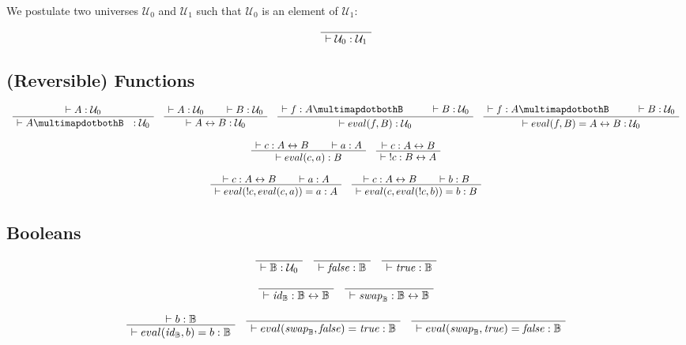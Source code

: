 \documentclass[format=acmlarge,review,natbib]{acmart}
\newcommand{\invc}[1]{!#1}
\newcommand{\evalone}[2]{eval(#1,#2)}
\newcommand{\idc}{\mathit{id}_{\boolt}}
\newcommand{\swapc}{\mathit{swap}_{\boolt}}
\newcommand{\iso}{\leftrightarrow}
\newcommand{\piso}{\multimapdotbothB~~}
\newcommand{\fc}{\mathit{false}}
\newcommand{\tc}{\mathit{true}}
\newcommand{\boolt}{\mathbb{B}}
\newcommand{\uzero}{\mathcal{U}_0}
\newcommand{\uone}{\mathcal{U}_1}
\newcommand{\proves}{\vdash}
\newcommand{\jdg}[2]{\proves #1 : #2}
\begin{document}
We postulate two universes $\uzero$ and $\uone$ such that $\uzero$ is an element
of $\uone$:

\[
  \AxiomC{}
  \UnaryInfC{$\jdg{\uzero}{\uone}$}
  \DisplayProof
\]

\subsection{(Reversible) Functions}

\[
  \begin{array}{c}
    \AxiomC{$\jdg{A}{\uzero}$}
    \UnaryInfC{$\jdg{A\piso}{\uzero}$}
    \DisplayProof
    \quad
    \AxiomC{$\jdg{A}{\uzero}$}
    \AxiomC{$\jdg{B}{\uzero}$}
    \BinaryInfC{$\jdg{A\iso B}{\uzero}$}
    \DisplayProof
    \quad
    \AxiomC{$\jdg{f}{A \piso}$}
    \AxiomC{$\jdg{B}{\uzero}$}
    \BinaryInfC{$\jdg{\evalone{f}{B}}{\uzero}$}
    \DisplayProof
    \quad
    \AxiomC{$\jdg{f}{A \piso}$}
    \AxiomC{$\jdg{B}{\uzero}$}
    \BinaryInfC{$\jdg{\evalone{f}{B} = A \iso B}{\uzero}$}
    \DisplayProof
    \\
    \\
    \AxiomC{$\jdg{c}{A \iso B}$}
    \AxiomC{$\jdg{a}{A}$}
    \BinaryInfC{$\jdg{\evalone{c}{a}}{B}$}
    \DisplayProof
    \quad
    \AxiomC{$\jdg{c}{A \iso B}$}
    \UnaryInfC{$\jdg{\;\invc{c}}{B \iso A}$}
    \DisplayProof
    \\
    \\
    \AxiomC{$\jdg{c}{A \iso B}$}
    \AxiomC{$\jdg{a}{A}$}
    \BinaryInfC{$\jdg{\evalone{\invc{c}}{\evalone{c}{a}} = a}{A}$}
    \DisplayProof
    \quad
    \AxiomC{$\jdg{c}{A \iso B}$}
    \AxiomC{$\jdg{b}{B}$}
    \BinaryInfC{$\jdg{\evalone{c}{\evalone{\invc{c}}{b}} = b}{B}$}
    \DisplayProof
  \end{array}
\]

\subsection{Booleans}

\[
  \begin{array}{c}
    \AxiomC{}
    \UnaryInfC{$\jdg{\boolt}{\uzero}$}
    \DisplayProof
    \quad
    \AxiomC{}
    \UnaryInfC{$\jdg{\fc}{\boolt}$}
    \DisplayProof
    \quad
    \AxiomC{}
    \UnaryInfC{$\jdg{\tc}{\boolt}$}
    \DisplayProof
    \\
    \\
    \AxiomC{}
    \UnaryInfC{$\jdg{\idc}{\boolt\iso\boolt}$}
    \DisplayProof
    \quad
    \AxiomC{}
    \UnaryInfC{$\jdg{\swapc}{\boolt\iso\boolt}$}
    \DisplayProof
    \\
    \\
    \AxiomC{$\jdg{b}{\boolt}$}
    \UnaryInfC{$\jdg{\evalone{\idc}{b} = b}{\boolt}$}
    \DisplayProof
    \quad
    \AxiomC{}
    \UnaryInfC{$\jdg{\evalone{\swapc}{\fc} = \tc}{\boolt}$}
    \DisplayProof
    \quad
    \AxiomC{}
    \UnaryInfC{$\jdg{\evalone{\swapc}{\tc} = \fc}{\boolt}$}
    \DisplayProof
  \end{array}
\]
\end{document}
